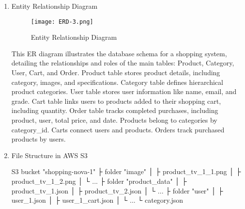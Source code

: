 \documentclass[conference]{IEEEtran}
\begin{document}
\begin{enumerate}

\item Entity Relationship Diagram
\begin{figure}[H]
    \centering
    \texttt{[image: ERD-3.png]}
    \caption{Entity Relationship Diagram}
    \label{fig:entity-relationship diagram}
\end{figure}
\hspace*{2ex}
This ER diagram illustrates the database schema for a shopping system, detailing the relationships and roles of the main tables: Product, Category, User, Cart, and Order. Product table stores product details, including category, images, and specifications.
Category table defines hierarchical product categories.
User table stores user information like name, email, and grade.
Cart table links users to products added to their shopping cart, including quantity.
Order table tracks completed purchases, including product, user, total price, and date.
Products belong to categories by category\_id.
Carts connect users and products.
Orders track purchased products by users.

\item File Structure in AWS S3 

S3 bucket "shopping-nova-1" \newline\hspace*{2.5ex}
├ folder "image" \newline\hspace*{2.5ex}
│     ├ product\_tv\_1\_1.png \newline\hspace*{2.5ex}
│     ├ product\_tv\_1\_2.png \newline\hspace*{2.5ex}
│     └ ... \newline\hspace*{2.5ex}
├ folder "product\_data" \newline\hspace*{2.5ex}
│     ├ product\_tv\_1.json \newline\hspace*{2.5ex}
│     ├ product\_tv\_2.json \newline\hspace*{2.5ex}
│     └ ...  \newline\hspace*{2.5ex}
├ folder "user" \newline\hspace*{2.5ex}
│     ├ user\_1.json \newline\hspace*{2.5ex}
│     ├ user\_1\_cart.json\newline\hspace*{2.5ex}
│     └ ...\newline\hspace*{2.5ex}
└ category.json

\end{enumerate}
\end{document}
